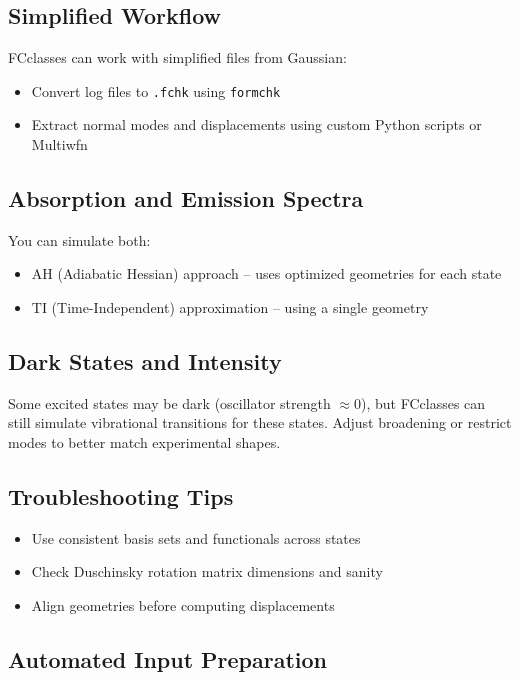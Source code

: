 \subsection*{Simplified Workflow}

FCclasses can work with simplified files from Gaussian:

\begin{itemize}
  \item Convert log files to \texttt{.fchk} using \texttt{formchk}
  \item Extract normal modes and displacements using custom Python scripts or Multiwfn
\end{itemize}

\subsection*{Absorption and Emission Spectra}

You can simulate both:

\begin{itemize}
  \item AH (Adiabatic Hessian) approach – uses optimized geometries for each state
  \item TI (Time-Independent) approximation – using a single geometry
\end{itemize}

\subsection*{Dark States and Intensity}

Some excited states may be dark (oscillator strength $\approx 0$), but FCclasses can still simulate vibrational transitions for these states. Adjust broadening or restrict modes to better match experimental shapes.

\subsection*{Troubleshooting Tips}

\begin{itemize}
  \item Use consistent basis sets and functionals across states
  \item Check Duschinsky rotation matrix dimensions and sanity
  \item Align geometries before computing displacements
\end{itemize}

\subsection*{Automated Input Preparation}


